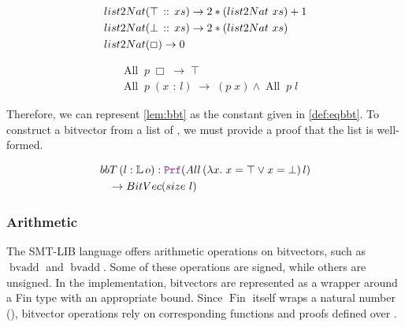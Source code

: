 \begin{definition}
\begin{align*}
&\mathop{list2Nat}(\top \,::\, xs) \rightarrow 2 * (\mathop{list2Nat}\,xs) + 1 \\
&\mathop{list2Nat}(\bot \,::\, xs) \rightarrow 2 * (\mathop{list2Nat}\,xs) \\
&\mathop{list2Nat}(\Box) \rightarrow 0
\end{align*}

\begin{align*}
&\mathop{All}\;p\;\Box \;\rightarrow\; \top \\
&\mathop{All}\;p\;(x \,\::\, l) \;\rightarrow\; (p\;x) \land \mathop{All}\;p\;l
\end{align*}
\end{definition}

Therefore, we can represent \cref{lem:bbt} as the constant given in \cref{def:eqbbt}.
To construct a bitvector from a list of , we must provide a proof that the list is well-formed.

\begin{definition}
\begin{align*}
&\mathop{bbT}\,(l : \bb{L}\,o) : \prf (\mathop{All}\,(\lambda x.\; x = \top \lor x = \bot)\,l)\\
&\quad \ra \mathop{BitVec}(\mathop{size}\,l)
\end{align*}
\label{def:eqbbt}
\end{definition}


\subsubsection{Arithmetic}

The SMT-LIB language offers arithmetic operations on bitvectors, such as $\mathop{bvadd}$ and $\mathop{bvadd}$. 
Some of these operations are signed, while others are unsigned. In the implementation, bitvectors are represented as a wrapper around a Fin type with an appropriate bound.
Since $\mathop{Fin}$ itself wraps a natural number (\N), bitvector operations rely on corresponding functions and proofs defined over \N.

